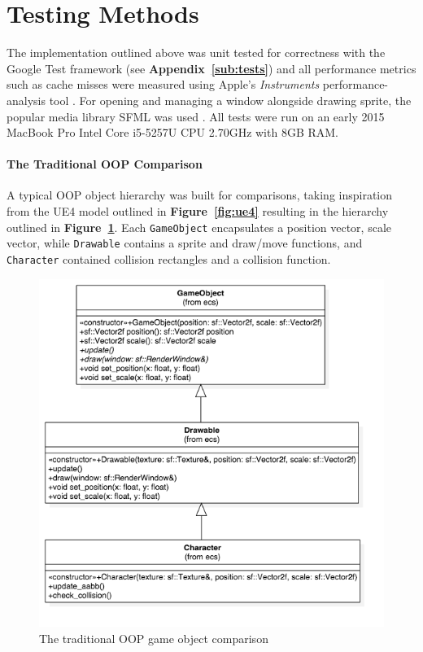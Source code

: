 \documentclass[10pt]{scrartcl}
\begin{document}

	

	\section{Testing Methods} %
	\label{sec:comparison_methods}

	The implementation outlined above was unit tested for correctness with the Google Test framework \parencite{gtest} (see \textbf{Appendix~\ref{sub:tests}}) and all performance metrics such as cache misses were measured using Apple's \textit{Instruments} performance-analysis tool \parencite{instruments}. For opening and managing a window alongside drawing sprite, the popular media library SFML was used \parencite{sfml}. All tests were run on an early 2015 MacBook Pro Intel Core i5-5257U CPU 2.70GHz with 8GB RAM.
	\par

	\paragraph{The Traditional OOP Comparison} %
	\label{sub:the_oop_comparison}
	A typical OOP object hierarchy was built for comparisons, taking inspiration from the UE4 model outlined in \textbf{Figure~\ref{fig:ue4}} resulting in the hierarchy outlined in \textbf{Figure~\ref{fig:gameobject}}. Each \texttt{GameObject} encapsulates a position vector, scale vector, while \texttt{Drawable} contains a sprite and draw/move functions, and \texttt{Character} contained collision rectangles and a collision function.

	\begin{figure}[H]
		\centering
		\includegraphics[width=\textwidth]{models/gameobject.png}
		\caption{The traditional OOP game object comparison}
		\label{fig:gameobject}
	\end{figure}
\end{document}
